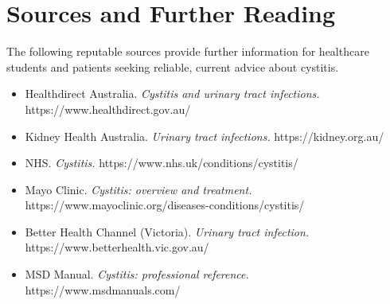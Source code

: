\section*{Sources and Further Reading}
The following reputable sources provide further information for healthcare students and patients seeking reliable, current advice about cystitis.

\begin{itemize}
    \item Healthdirect Australia. \textit{Cystitis and urinary tract infections.} https://www.healthdirect.gov.au/
    \item Kidney Health Australia. \textit{Urinary tract infections.} https://kidney.org.au/
    \item NHS. \textit{Cystitis.} https://www.nhs.uk/conditions/cystitis/
    \item Mayo Clinic. \textit{Cystitis: overview and treatment.} https://www.mayoclinic.org/diseases-conditions/cystitis/
    \item Better Health Channel (Victoria). \textit{Urinary tract infection.} https://www.betterhealth.vic.gov.au/
    \item MSD Manual. \textit{Cystitis: professional reference.} https://www.msdmanuals.com/
\end{itemize}
